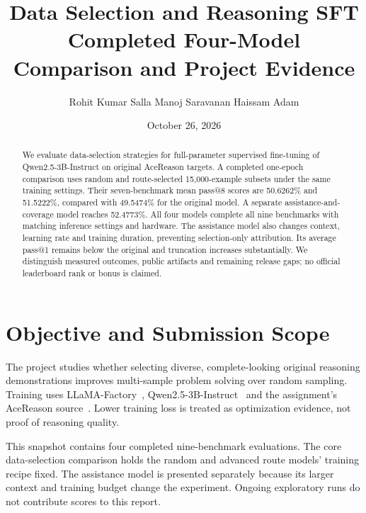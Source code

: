 \documentclass[10pt,letterpaper]{article}
\title{\vspace{-1.5em}\textbf{Data Selection and Reasoning SFT}\\\large Completed Four-Model Comparison and Project Evidence}
\author{Rohit Kumar Salla \quad Manoj Saravanan \quad Haissam Adam}
\date{October 26, 2026}
\begin{document}
\maketitle\thispagestyle{fancy}
\begin{abstract}
We evaluate data-selection strategies for full-parameter supervised fine-tuning of Qwen2.5-3B-Instruct on original AceReason targets. A completed one-epoch comparison uses random and route-selected 15,000-example subsets under the same training settings. Their seven-benchmark mean pass@8 scores are 50.6262\% and 51.5222\%, compared with 49.5474\% for the original model. A separate assistance-and-coverage model reaches 52.4773\%. All four models complete all nine benchmarks with matching inference settings and hardware. The assistance model also changes context, learning rate and training duration, preventing selection-only attribution. Its average pass@1 remains below the original and truncation increases substantially. We distinguish measured outcomes, public artifacts and remaining release gaps; no official leaderboard rank or bonus is claimed.
\end{abstract}

\section{Objective and Submission Scope}
The project studies whether selecting diverse, complete-looking original reasoning demonstrations improves multi-sample problem solving over random sampling. Training uses LLaMA-Factory~\cite{llamafactory}, Qwen2.5-3B-Instruct~\cite{qwen} and the assignment's AceReason source~\cite{acereason,assignment}. Lower training loss is treated as optimization evidence, not proof of reasoning quality.

This snapshot contains four completed nine-benchmark evaluations. The core data-selection comparison holds the random and advanced route models' training recipe fixed. The assistance model is presented separately because its larger context and training budget change the experiment. Ongoing exploratory runs do not contribute scores to this report.
\end{document}
